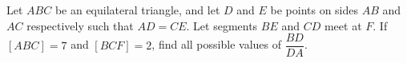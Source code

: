 Let $ABC$ be an equilateral triangle, and let $D$ and $E$ be points on sides $AB$ and $AC$ respectively such that $AD=CE$. Let segments $BE$ and $CD$ meet at $F$. If $[ABC]=7$ and $[BCF]=2$, find all possible values of $\dfrac{BD}{DA}$.
